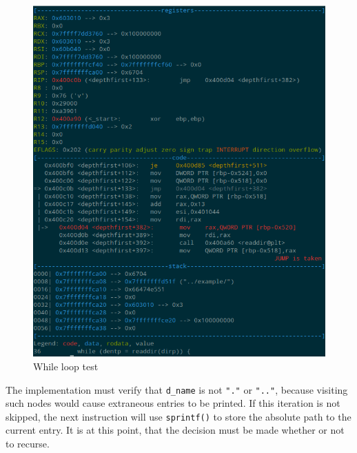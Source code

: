 \documentclass[a4paper,12pt,sffamily]{article}
\begin{document}
\begin{figure}[H]
	\centering
	\includegraphics[width=1\linewidth]{./images/6}
	\caption[while_loop_test]{While loop test}
	\label{fig:7}
\end{figure}
The implementation must verify that \texttt{d_name} is not \texttt{"."} or 
\texttt{".."}, because visiting such nodes would cause extraneous entries to be printed. If this
iteration is not skipped, the next instruction will use \texttt{sprintf()} to store the absolute
path to the current entry. It is at this point, that the decision must be made whether or not to recurse.
\end{document}
